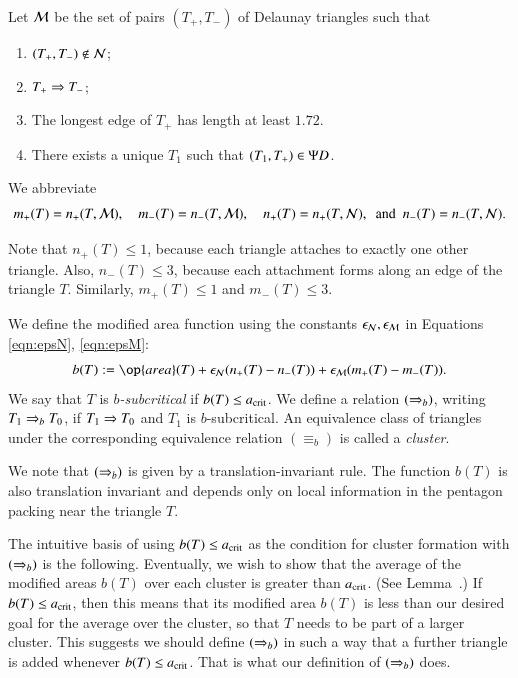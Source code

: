 Let $\mathcal M$ be the set of pairs $(T_+,T_-)$ of Delaunay triangles such that
\begin{enumerate}
\item $(T_+,T_-)\not\in \mathcal N$;
\item $T_+\Rightarrow T_-$;
\item The longest edge of $T_+$ has length  at least $1.72$.
\item There exists a unique $T_1$ such that $(T_1,T_+)\in \Psi D$.
\end{enumerate}

We abbreviate 
\[
m_+(T) = n_+(T,\M), 
\quad m_-(T) = n_-(T,\M), 
\quad n_+(T) =n_+(T,\N), 
\ \text{ and } \ 
n_-(T) = n_-(T,\N).
\]

\begin{remark}
  Note  that $n_+(T)\le 1$, because each triangle attaches to
  exactly one other triangle.  Also, $n_-(T)\le 3$, because each
  attachment forms along an edge of the triangle $T$.  Similarly,
  $m_+(T)\le 1$ and $m_-(T)\le 3$.
\end{remark}


We define the modified area function using the constants $\epsilon_{\mathcal N},\epsilon_{\mathcal M}$
in Equations \eqref{eqn:epsN}, \eqref{eqn:epsM}:
\begin{equation}
b(T) := \op{area}(T) + \epsN (n_+(T) - n_-(T)) + \epsM (m_+(T) - m_-(T)).
\end{equation}
We say that $T$ is {\it $b$-subcritical} if $b(T) \le a_\text{crit}$.  We define
a relation $(\Rightarrow_{b})$, writing
$T_1\Rightarrow_{b} T_0$, if $T_1\Rightarrow T_0$ and $T_1$ is $b$-subcritical.  An
equivalence class of triangles under the corresponding equivalence
relation $(\equiv_b)$ is called a {\it cluster}.

We note that $(\Rightarrow_{b})$ is given by a translation-invariant rule.  The
function $b(T)$ is also translation invariant and depends only on
local information in the pentagon packing near the triangle $T$.

The intuitive basis of using $b(T)\le a_\text{crit}$ as the condition for
cluster formation with $(\Rightarrow_{b})$ is the following.  Eventually, we wish
to show that the average of the modified areas $b(T)$ over each
cluster is greater than $a_\text{crit}$.  (See Lemma~.)  If
$b(T)\le a_\text{crit}$, then this means that its modified area $b(T)$ is
less than our desired goal for the average over the cluster, so that
$T$ needs to be part of a larger cluster.  This suggests we should
define $(\Rightarrow_{b})$ in such a way that a further triangle is added
whenever $b(T)\le a_\text{crit}$. That is what our definition of $(\Rightarrow_{b})$
does.

